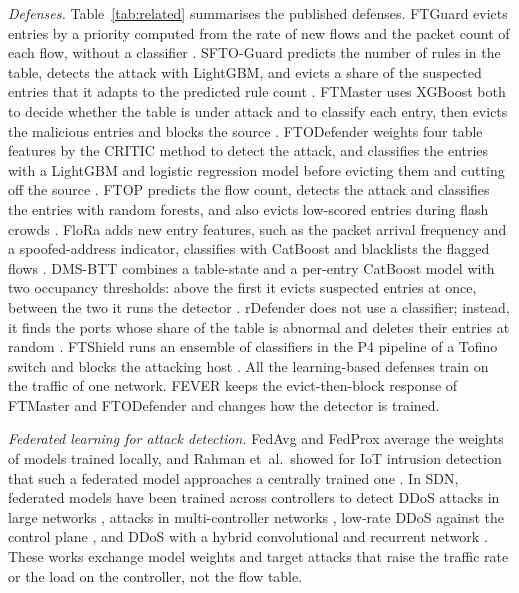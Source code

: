 \documentclass[conference]{IEEEtran}
\begin{document}
\textit{Defenses.} Table~\ref{tab:related} summarises the published defenses. FTGuard evicts entries by
a priority computed from the rate of new flows and the packet count of each flow, without a classifier
\cite{zhang2017ftguard}. SFTO-Guard predicts the number of rules in the table, detects the attack with
LightGBM, and evicts a share of the suspected entries that it adapts to the predicted rule count
\cite{tang2023sftoguard}. FTMaster uses XGBoost both to decide whether the table is under attack and to
classify each entry, then evicts the malicious entries and blocks the source \cite{tang2023ftmaster}.
FTODefender weights four table features by the CRITIC method to detect the attack, and classifies the
entries with a LightGBM and logistic regression model before evicting them and cutting off the source
\cite{tang2024ftodefender}. FTOP predicts the flow count, detects the attack and classifies the entries
with random forests, and also evicts low-scored entries during flash crowds \cite{tang2024ftop}. FloRa
adds new entry features, such as the packet arrival frequency and a spoofed-address indicator, classifies
with CatBoost and blacklists the flagged flows \cite{mudgal2024flora}. DMS-BTT combines a table-state and
a per-entry CatBoost model with two occupancy thresholds: above the first it evicts suspected entries at
once, between the two it runs the detector \cite{tang2025dmsbtt}. rDefender does not use a classifier;
instead, it finds the ports whose share of the table is abnormal and deletes their entries at random
\cite{kong2024rdefender}. FTShield runs an ensemble of classifiers in the P4 pipeline of a Tofino switch
and blocks the attacking host \cite{jain2025ftshield}. All the learning-based defenses train on the
traffic of one network. FEVER keeps the evict-then-block response of FTMaster and FTODefender and changes
how the detector is trained.

\textit{Federated learning for attack detection.} FedAvg \cite{mcmahan2017fedavg} and FedProx
\cite{li2020fedprox} average the weights of models trained locally, and Rahman et~al.\ showed for IoT
intrusion detection that such a federated model approaches a centrally trained one
\cite{rahman2020iotfl}. In SDN, federated models have been trained across controllers to detect DDoS
attacks in large networks \cite{fotse2025fedlad}, attacks in multi-controller networks
\cite{alkhamisi2024fedsec}, low-rate DDoS against the control plane \cite{ali2023lrddos}, and DDoS with a
hybrid convolutional and recurrent network \cite{zhou2025fedddos}. These works exchange model weights and
target attacks that raise the traffic rate or the load on the controller, not the flow table.
\end{document}
